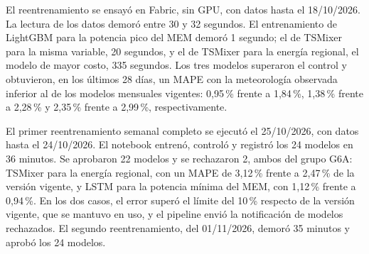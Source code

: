 El reentrenamiento se ensayó en Fabric, sin GPU, con datos hasta el 18/10/2026. La lectura de los datos demoró entre 30 y 32 segundos. El entrenamiento de LightGBM para la potencia pico del MEM demoró 1 segundo; el de TSMixer para la misma variable, 20 segundos, y el de TSMixer para la energía regional, el modelo de mayor costo, 335 segundos. Los tres modelos superaron el control y obtuvieron, en los últimos 28 días, un MAPE con la meteorología observada inferior al de los modelos mensuales vigentes: 0,95\,\% frente a 1,84\,\%, 1,38\,\% frente a 2,28\,\% y 2,35\,\% frente a 2,99\,\%, respectivamente.

El primer reentrenamiento semanal completo se ejecutó el 25/10/2026, con datos hasta el 24/10/2026. El notebook  entrenó, controló y registró los 24 modelos en 36 minutos. Se aprobaron 22 modelos y se rechazaron 2, ambos del grupo G6A: TSMixer para la energía regional, con un MAPE de 3,12\,\% frente a 2,47\,\% de la versión vigente, y LSTM para la potencia mínima del MEM, con 1,12\,\% frente a 0,94\,\%. En los dos casos, el error superó el límite del 10\,\% respecto de la versión vigente, que se mantuvo en uso, y el pipeline envió la notificación de modelos rechazados. El segundo reentrenamiento, del 01/11/2026, demoró 35 minutos y aprobó los 24 modelos.
